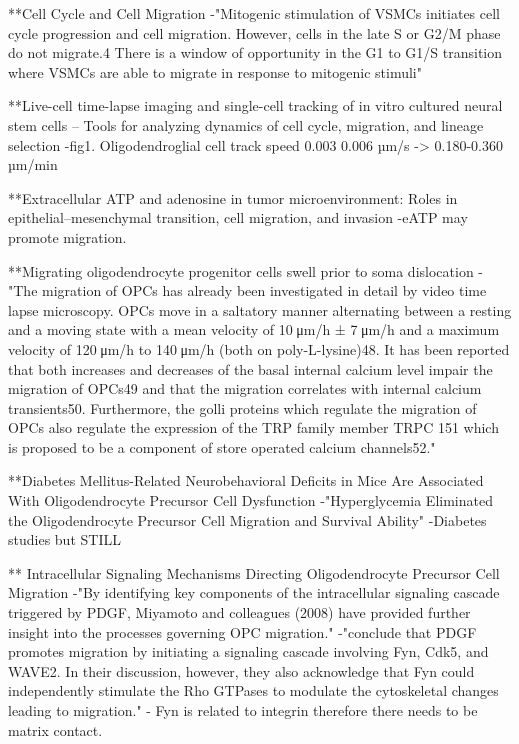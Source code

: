 \documentclass[11pt,a4paper]{article}
\begin{document}
**Cell Cycle and Cell Migration 
-"Mitogenic stimulation of VSMCs initiates cell cycle progression and cell migration. However, cells in the late S or G2/M phase do not migrate.4 There is a window of opportunity in the G1 to G1/S transition where VSMCs are able to migrate in response to mitogenic stimuli"

**Live-cell time-lapse imaging and single-cell tracking of in vitro cultured neural stem cells – Tools for analyzing dynamics of cell cycle, migration, and lineage selection
-fig1. Oligodendroglial cell track speed 0.003 0.006 µm/s -> 0.180-0.360 µm/min

**Extracellular ATP and adenosine in tumor microenvironment: Roles in epithelial–mesenchymal transition, cell migration, and invasion 
-eATP may promote migration.


**Migrating oligodendrocyte progenitor cells swell prior to soma dislocation 
-"The migration of OPCs has already been investigated in detail by video time lapse microscopy. OPCs move in a saltatory manner alternating between a resting and a moving state with a mean velocity of 10 μm/h ± 7 μm/h and a maximum velocity of 120 μm/h to 140 μm/h (both on poly-L-lysine)48. It has been reported that both increases and decreases of the basal internal calcium level impair the migration of OPCs49 and that the migration correlates with internal calcium transients50. Furthermore, the golli proteins which regulate the migration of OPCs also regulate the expression of the TRP family member TRPC 151 which is proposed to be a component of store operated calcium channels52."


**Diabetes Mellitus-Related Neurobehavioral Deficits in Mice Are Associated With Oligodendrocyte Precursor Cell Dysfunction
-"Hyperglycemia Eliminated the Oligodendrocyte Precursor Cell Migration and Survival Ability"
-Diabetes studies but STILL


** Intracellular Signaling Mechanisms Directing Oligodendrocyte Precursor Cell Migration
-"By identifying key components of the intracellular signaling cascade triggered by PDGF, Miyamoto and colleagues (2008) have provided further insight into the processes governing OPC migration."
-"conclude that PDGF promotes migration by initiating a signaling cascade involving Fyn, Cdk5, and WAVE2. In their discussion, however, they also acknowledge that Fyn could independently stimulate the Rho GTPases to modulate the cytoskeletal changes leading to migration."
- Fyn is related to integrin therefore there needs to be matrix contact.
\end{document}
